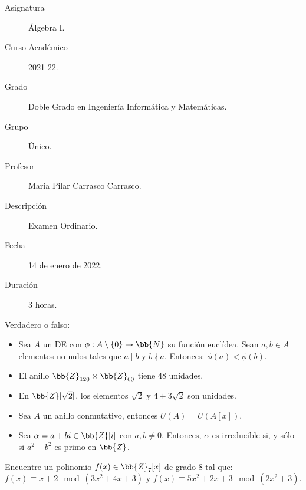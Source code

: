 \documentclass[12pt]{article}
\newcounter{ejercicio}[section] %
\newcounter{ejercicio}
\begin{document}

    
    

    
    \begin{description}
        \item[Asignatura] Álgebra I.
        \item[Curso Académico] 2021-22.
        \item[Grado] Doble Grado en Ingeniería Informática y Matemáticas.
        \item[Grupo] Único.
        \item[Profesor] María Pilar Carrasco Carrasco.
        \item[Descripción] Examen Ordinario.
        \item[Fecha] 14 de enero de 2022.
        \item[Duración] 3 horas.
    
    \end{description}
    \newpage
    
    \begin{ejercicio}
        Verdadero o falso:
        \begin{itemize}
            \item Sea $A$ un DE con $\phi:A\setminus\{0\} \rightarrow \bb{N}$ su función euclídea. Sean $a,b \in A$ elementos no nulos tales que $a\mid b$ y $b\nmid a$. Entonces: $\phi(a)<\phi(b)$.
            \item El anillo $\bb{Z}_{120} \times \bb{Z}_{60}$ tiene 48 unidades.
            \item En $\bb{Z}[\sqrt{2}]$, los elementos $\sqrt{2}$ y $4+3\sqrt{2}$ son unidades.
            \item Sea $A$ un anillo conmutativo, entonces $U(A) = U(A[x])$.
            \item Sea $\alpha = a+bi \in \bb{Z}[i]$ con $a,b \neq 0$. Entonces, $\alpha$ es irreducible si, y sólo si $a^2 + b^2$ es primo en $\bb{Z}$.
        \end{itemize}
    \end{ejercicio}

    \begin{ejercicio}
        Encuentre un polinomio $f(x)\in \bb{Z}_7[x]$ de grado $8$ tal que:\newline
        $f(x)\equiv x+2 \mod (3x^2 + 4x + 3)$ y $f(x)\equiv 5x^2 + 2x + 3 \mod (2x^2+3)$.
    \end{ejercicio}
\end{document}
